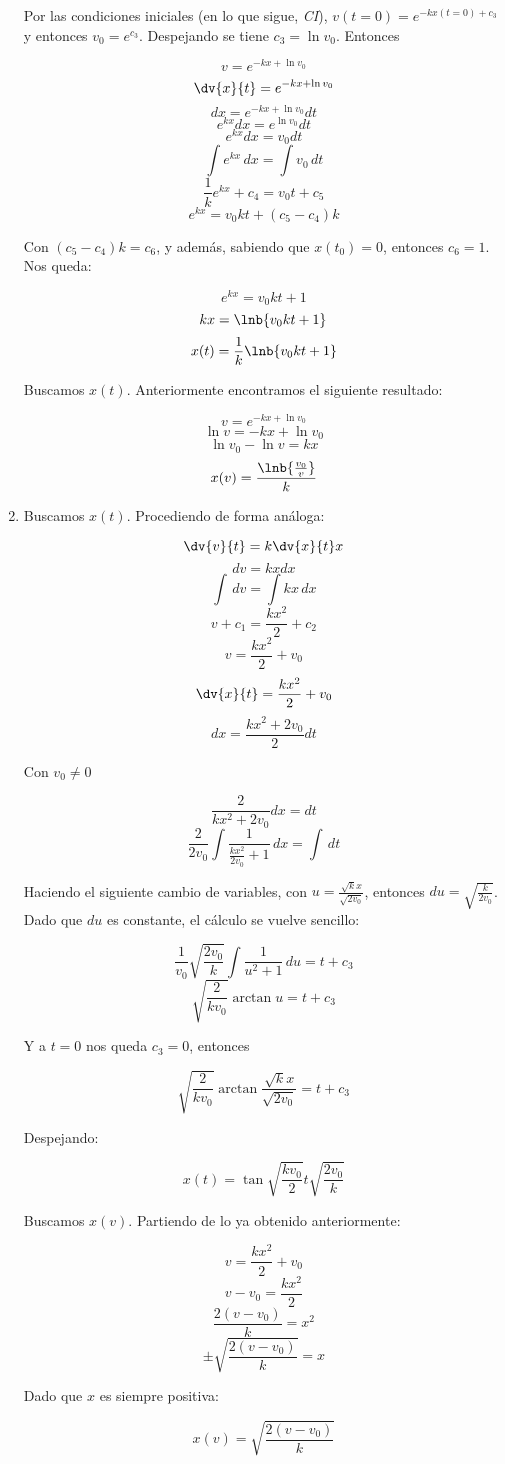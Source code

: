 \begin{enumerate}
	Por las condiciones iniciales (en lo que sigue, \emph{CI}), $ v(t = 0) = e^{-kx(t = 0) + c_3} $ y entonces
	$ v_0 = e^{c_3} $. Despejando se tiene $c_3 = \ln v_0 $. Entonces
	
	$$ v = e^{-kx + \ln v_0 } $$
	$$ \dv{x}{t} = e^{-kx + \ln v_0 } $$
	$$ dx = e^{-kx + \ln v_0 }dt $$
	$$ e^{kx} dx = e^{\ln v_0 }dt $$
	$$ e^{kx} dx = v_0 dt $$
	$$ \int \! e^{kx} \, dx = \int \! v_0 \, dt $$
	$$ \frac{1}{k}e^{kx} + c_4 = v_0t + c_5 $$
	$$ e^{kx} = v_0kt + \left(c_5 - c_4\right)k $$
	
	Con $\left(c_5 - c_4\right)k = c_6$, y adem\'as, sabiendo que $x(t_0) = 0$, entonces $c_6 = 1$. Nos queda:
	
	$$ e^{kx} = v_0kt + 1 $$
	$$ kx = \lnb{v_0kt + 1} $$
	$$ x(t) = \frac{1}{k} \lnb{v_0kt + 1} $$
	
	Buscamos $x(t)$. Anteriormente encontramos el siguiente resultado:
	
	$$ v = e^{-kx + \ln v_0 } $$
	$$ \ln v = -kx + \ln v_0 $$
	$$ \ln v_0 - \ln v = kx $$
	$$ x(v) = \frac{\lnb{\frac{v_0}{v}}}{k} $$
	
\item

	Buscamos $x(t)$. Procediendo de forma an\'aloga:
	
	$$ \dv{v}{t} = k\dv{x}{t}x $$
	$$ dv = kx dx $$
	$$ \int \! \, dv = \int \! kx \, dx $$
	$$ v + c_1 = \frac{kx^2}{2} + c_2 $$
	$$ v = \frac{kx^2}{2} + v_0 $$
	$$ \dv{x}{t} = \frac{kx^2}{2} + v_0 $$
	$$ dx = \frac{kx^2 + 2v_0}{2}dt$$

	Con $v_0 \neq 0$	
	
	$$ \frac{2}{kx^2 + 2v_0}dx = dt$$
	$$ \frac{2}{2v_0} \int \! \frac{1}{\frac{kx^2}{2v_0} + 1} \, dx = \int \! \, dt$$

	Haciendo el siguiente cambio de variables, con $u = \frac{\sqrt{k}x}{\sqrt{2v_0}}$, 
	entonces $du = \sqrt{\frac{k}{2v_0}}$. Dado que $du$ es constante, el c\'alculo se vuelve sencillo:
	
	$$ \frac{1}{v_0} \sqrt{\frac{2v_0}{k}} \int \! \frac{1}{u^2 + 1} \, du = t + c_3 $$
	$$ \sqrt{\frac{2}{kv_0}} \arctan u = t + c_3 $$
	
	Y a $t = 0$ nos queda $c_3 = 0$, entonces
	
	$$ \sqrt{\frac{2}{kv_0}} \arctan \frac{\sqrt{k}x}{\sqrt{2v_0}} = t + c_3 $$
	
	Despejando:
	
	$$ x(t) = \tan{\sqrt{\frac{kv_0}{2}}t}\sqrt{\frac{2v_0}{k}}$$
	
	Buscamos $x(v)$. Partiendo de lo ya obtenido anteriormente:
	
	$$ v = \frac{kx^2}{2} + v_0 $$
	$$ v - v_0 = \frac{kx^2}{2} $$
	$$ \frac{2\left(v - v_0\right)}{k} = x^2 $$
	$$ \pm \sqrt{\frac{2\left(v - v_0\right)}{k}} = x $$
	
	Dado que $x$ es siempre positiva:
	
	$$ x(v) = \sqrt{\frac{2\left(v - v_0\right)}{k}}$$

\end{enumerate}